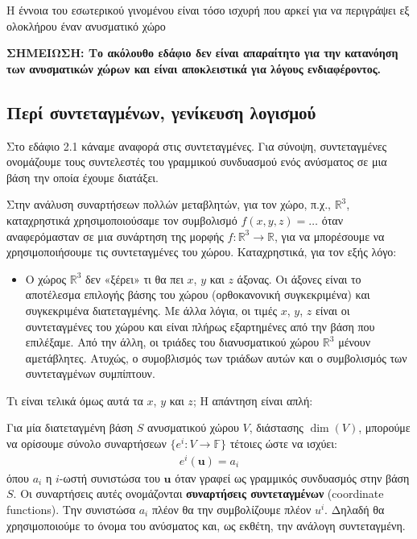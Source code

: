 \documentclass[main.tex]{subfiles}
\begin{document}
	Η έννοια του εσωτερικού γινομένου είναι τόσο ισχυρή που αρκεί για να περιγράψει εξ ολοκλήρου έναν ανυσματικό χώρο
	
	\textbf{ΣΗΜΕΙΩΣΗ: Το ακόλουθο εδάφιο δεν είναι απαραίτητο για την κατανόηση των ανυσματικών χώρων και είναι αποκλειστικά για λόγους ενδιαφέροντος.}
	
	\subsection{Περί συντεταγμένων, γενίκευση λογισμού}
	Στο εδάφιο 2.1 κάναμε αναφορά στις συντεταγμένες. Για σύνοψη, συντεταγμένες ονομάζουμε τους συντελεστές του γραμμικού συνδυασμού ενός ανύσματος σε μια βάση την οποία έχουμε διατάξει. 
	
	Στην ανάλυση συναρτήσεων πολλών μεταβλητών, για τον χώρο, π.χ., $\mathbb{R}^3$, καταχρηστικά χρησιμοποιούσαμε τον συμβολισμό $f(x,y,z) = \ldots$ όταν αναφερόμασταν σε μια συνάρτηση της μορφής ${f:\mathbb{R}^3\rightarrow\mathbb{R}}$, για να μπορέσουμε να χρησιμοποιήσουμε τις συντεταγμένες του χώρου. Καταχρηστικά, για τον εξής λόγο:
	\begin{itemize} 
		\item Ο χώρος $\mathbb{R}^3$ δεν «ξέρει» τι θα πει $x$, $y$ και $z$ άξονας. Οι άξονες είναι το αποτέλεσμα επιλογής βάσης του χώρου (ορθοκανονική συγκεκριμένα) και συγκεκριμένα διατεταγμένης. Με άλλα λόγια, οι τιμές $x$, $y$, $z$ είναι οι συντεταγμένες του χώρου και είναι πλήρως εξαρτημένες από την βάση που επιλέξαμε. Από την άλλη, οι τριάδες του διανυσματικού χώρου $\mathbb{R}^3$ μένουν αμετάβλητες. Ατυχώς, ο συμοβλισμός των τριάδων αυτών και ο συμβολισμός των συντεταγμένων συμπίπτουν.
	\end{itemize}

	Τι είναι τελικά όμως αυτά τα $x$, $y$ και $z$; Η απάντηση είναι απλή:
	\begin{definition}
		Για μία διατεταγμένη βάση $S$ ανυσματικού χώρου $V$, διάστασης $\dim(V)$, μπορούμε να ορίσουμε σύνολο συναρτήσεων ${\{e^i:V\rightarrow\mathbb{F}\}}$ τέτοιες ώστε
		να ισχύει:
		\begin{align*}
			e^i(\boldsymbol{u}) = a_i
		\end{align*}
		όπου $a_i$ η $i$-ωστή συνιστώσα του $\boldsymbol{u}$ όταν γραφεί ως γραμμικός συνδυασμός στην βάση $S$. Οι συναρτήσεις αυτές ονομάζονται \textbf{συναρτήσεις συντεταγμένων} (coordinate functions). Την συνιστώσα $a_i$ πλέον θα την συμβολίζουμε πλέον $u^i$. Δηλαδή θα χρησιμοποιούμε το όνομα του ανύσματος και, ως εκθέτη, την ανάλογη συντεταγμένη.
	\end{definition}
\end{document}
